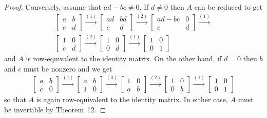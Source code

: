 \begin{proof}
  Conversely, assume that $ad - bc\neq0$. If $d\neq0$ then $A$ can be
  reduced to get
  \begin{gather*}
    \begin{bmatrix}
      a & b \\
      c & d
    \end{bmatrix}
    \xrightarrow{(1)}
    \begin{bmatrix}
      ad & bd \\
      c & d
    \end{bmatrix}
    \xrightarrow{(2)}
    \begin{bmatrix}
      ad - bc & 0 \\
      c & d
    \end{bmatrix}
    \xrightarrow{(1)} \\
    \begin{bmatrix}
      1 & 0 \\
      c & d
    \end{bmatrix}
    \xrightarrow{(2)}
    \begin{bmatrix}
      1 & 0 \\
      0 & d
    \end{bmatrix}
    \xrightarrow{(1)}
    \begin{bmatrix}
      1 & 0 \\
      0 & 1
    \end{bmatrix}
  \end{gather*}
  and $A$ is row-equivalent to the identity matrix. On the other hand,
  if $d = 0$ then $b$ and $c$ must be nonzero and we get
  \begin{gather*}
    \begin{bmatrix}
      a & b \\
      c & 0
    \end{bmatrix}
    \xrightarrow{(1)}
    \begin{bmatrix}
      a & b \\
      1 & 0
    \end{bmatrix}
    \xrightarrow{(3)}
    \begin{bmatrix}
      1 & 0 \\
      a & b
    \end{bmatrix}
    \xrightarrow{(2)}
    \begin{bmatrix}
      1 & 0 \\
      0 & b
    \end{bmatrix}
    \xrightarrow{(1)}
    \begin{bmatrix}
      1 & 0 \\
      0 & 1
    \end{bmatrix}
  \end{gather*}
  so that $A$ is again row-equivalent to the identity matrix. In
  either case, $A$ must be invertible by Theorem~12.
\end{proof}

